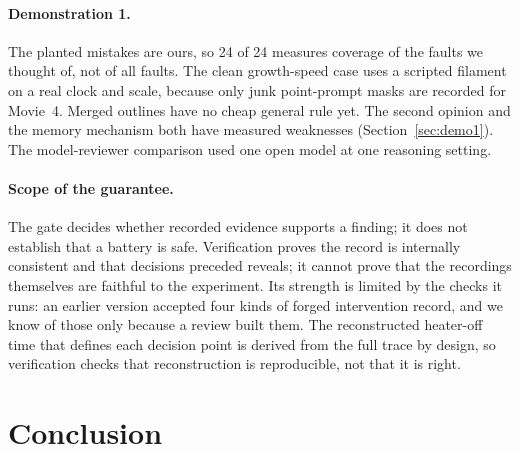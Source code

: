 \documentclass[11pt]{article}
\begin{document}
\paragraph{Demonstration 1.} The planted mistakes are ours, so 24 of 24 measures coverage of the faults we thought of,
not of all faults. The clean growth-speed case uses a scripted filament on a real clock and scale, because only junk
point-prompt masks are recorded for Movie~4. Merged outlines have no cheap general rule yet. The second opinion and
the memory mechanism both have measured weaknesses (Section~\ref{sec:demo1}). The model-reviewer comparison used one
open model at one reasoning setting.

\paragraph{Scope of the guarantee.} The gate decides whether recorded evidence supports a finding; it does not
establish that a battery is safe. Verification proves the record is internally consistent and that decisions preceded
reveals; it cannot prove that the recordings themselves are faithful to the experiment. Its strength is limited by
the checks it runs: an earlier version accepted four kinds of forged intervention record, and we know of those only
because a review built them. The reconstructed heater-off time that defines each decision point is derived from the
full trace by design, so verification checks that reconstruction is reproducible, not that it is right.

\section{Conclusion}\label{sec:conclusion}
\end{document}
